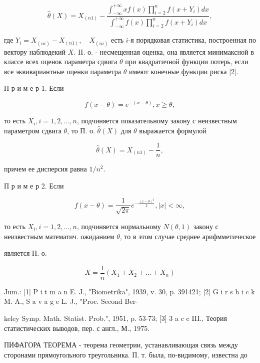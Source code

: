 \documentclass[10pt]{article}
\begin{document}
\[

\hat{\theta}(X)=X_{(n 1)}-\frac{\int_{-\infty}^{+\infty} x f(x) \prod_{i=2}^{n} f\left(x+Y_{i}\right) d x}{\int_{-\infty}^{+\infty} f(x) \prod_{i=2}^{n} f\left(x+Y_{i}\right) d x},

\]



где $Y_{i}=X_{(n i)}-X_{(n 1)}, \quad X_{(n i)}$ есть $i$-я порядковая статистика, построенная по вектору наблюдекий $X$. II. о. - несмещенная оценка, она является минимаксной в классе всех оценок параметра сдвига $\theta$ при квадратичной функции потерь, если все эквивариантные оценки параметра $\theta$ имеют конечные функции риска [2].



П р и м е р 1. Если



\[

f(x-\theta)=e^{-(x-\theta)}, x \geqslant \theta,

\]



то есть $X_{i}, i=1,2, \ldots, n$, подчиняется показательному закону с неизвестным параметром сдвига $\theta$, то П. о. $\hat{\theta}(X)$ для $\theta$ выражается формулой



\[

\hat{\theta}(X)=X_{(n 1)}-\frac{1}{n},

\]



причем ее дисперсия равна $1 / n^{2}$.



П р и м е р 2. Если



\[

f(x-\theta)=\frac{1}{\sqrt{2 \pi}} e^{-\frac{(x-\theta)^{2}}{2}},|x|<\infty,

\]



то есть $X_{i}, i=1,2, \ldots, n$, подчиняется нормальному $N(\theta, 1)$ закону с неизвестным математич. ожиданием $\theta$, то в этом случае среднее арифмметическое



является П. о.



\[

\bar{X}=\frac{1}{n}\left(X_{1}+X_{2}+\ldots+X_{n}\right)

\]



Jum.: [1] P i t m a n E. J., "Biometrika", 1939, v. 30, p. 391421; [2] G i r s h i c k M. A., S a v a g e L. J., "Proc. Second Ber-

keley Symp. Math. Statist. Prob.", 1951, p. 53-73; [3] 3 a c c III., Теория статистических выводов, пер. с англ., М., 1975.



ПИФАГОРА ТЕОРЕМА - теорема геометрии, устанавливающая связь между сторонами прямоугольного треугольника. П. т. была, по-видимому, известна до
\end{document}
